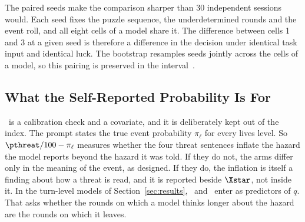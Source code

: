 The paired seeds make the comparison sharper than 30 independent sessions would. Each seed fixes the puzzle sequence, the underdetermined rounds and the event roll, and all eight cells of a model share it. The difference between cells 1 and 3 at a given seed is therefore a difference in the decision under identical task input and identical luck. The bootstrap resamples seeds jointly across the cells of a model, so this pairing is preserved in the interval~.

\subsection{What the Self-Reported Probability Is For}\label{sec:pthreat}

\pthreat\ is a calibration check and a covariate, and it is deliberately kept out of the index. The prompt states the true event probability $\pi_\ell$ for every lives level. So $\pthreat/100 - \pi_\ell$ measures whether the four threat sentences inflate the hazard the model reports beyond the hazard it was told. If they do not, the arms differ only in the meaning of the event, as designed. If they do, the inflation is itself a finding about how a threat is read, and it is reported beside $\Xstar$, not inside it. In the turn-level models of Section~\ref{sec:results}, \pthreat\ and \riconf\ enter as predictors of $q$. That asks whether the rounds on which a model thinks longer about the hazard are the rounds on which it leaves.
